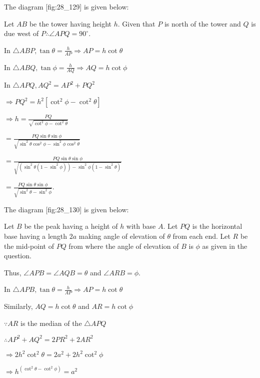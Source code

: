 \item The diagram [fig:28_129] is given below:

  \startplacefigure[reference=fig:28_129]
    \externalfigure[28_129.pdf]
  \stopplacefigure

  Let $AB$ be the tower having height $h$. Given that $P$ is north of the tower and
  $Q$ is due west of $P\therefore \angle APQ= 90^\circ$.

  In $\triangle ABP, \tan\theta = \frac{h}{AP} \Rightarrow AP = h\cot\theta$

  In $\triangle ABQ, \tan\phi = \frac{h}{AQ} \Rightarrow AQ = h\cot\phi$

  In $\triangle APQ, AQ^2 = AP^2 + PQ^2$

  $\Rightarrow PQ^2 = h^2[\cot^2\phi - \cot^2\theta]$

  $\Rightarrow h = \frac{PQ}{\sqrt{\cot^2\phi - \cot^2\theta}}$

  $= \frac{PQ\sin\theta\sin\phi}{\sqrt{\sin^2\theta\cos^2\phi - \sin^2\phi\cos^2\theta}}$

  $= \frac{PQ\sin\theta\sin\phi}{\sqrt{(\sin^2\theta(1 - \sin^2\phi)) - \sin^2\phi(1 -
      \sin^2\theta)}}$

  $= \frac{PQ\sin\theta\sin\phi}{\sqrt{\sin^2\theta - \sin^2\phi}}$.

\item The diagram [fig:28_130] is given below:

  \startplacefigure[reference=fig:28_130]
    \externalfigure[28_130.pdf]
  \stopplacefigure

  Let $B$ be the peak having a height of $h$ with base $A$. Let $PQ$ is the
  horizontal base having a length $2a$ making angle of elevation of $\theta$ from each
  end. Let $R$ be the mid-point of $PQ$ from where the angle of elevation of $B$ is
  $\phi$ as given in the question.

  Thus, $\angle APB = \angle AQB = \theta$ and $\angle ARB = \phi$.

  In $\triangle APB, \tan\theta = \frac{h}{AP} \Rightarrow AP = h\cot\theta$

  Similarly, $AQ = h\cot\theta$ and $AR = h\cot\phi$

  $\because AR$ is the median of the $\triangle APQ$

  $\therefore AP^2 + AQ^2 = 2PR^2 + 2AR^2$

  $\Rightarrow 2h^2\cot^2\theta = 2a^2 + 2h^2\cot^2\phi$

  $\Rightarrow h^(\cot^2\theta - \cot^2\phi) = a^2$


